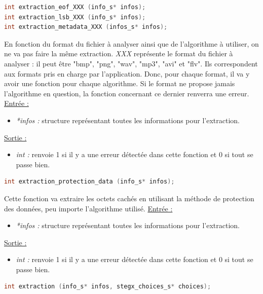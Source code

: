 \documentclass[11pt]{article}
\begin{document}
\begin{lstlisting}[language=c]
int extraction_eof_XXX (info_s* infos); 
int extraction_lsb_XXX (info_s* infos);
int extraction_metadata_XXX (infos_s* infos);
\end{lstlisting}

En fonction du format du fichier à analyser ainsi que de l'algorithme à 
utiliser, on ne va pas faire la même extraction. 
\textit{XXX} représente le format du fichier à analyser : il peut être 
"bmp", "png", "wav", "mp3", "avi" et "flv". Ils correspondent aux formats 
pris en charge par l'application. Donc, pour chaque format, il va y avoir 
une fonction pour chaque algorithme. Si le format ne propose jamais l'algorithme 
en question, la fonction concernant ce dernier renverra une erreur. 
\newline
\underline{Entrée :} 
\begin{itemize}
\item \textit{*infos :} structure représentant toutes les informations pour 
l'extraction. 
\end{itemize}
\underline{Sortie :} 
\begin{itemize}
\item \textit{int :} renvoie 1 si il y a une erreur détectée dans cette 
fonction et 0 si tout se passe bien.  
\newline 
\end{itemize}

\begin{lstlisting}[language=c]
int extraction_protection_data (info_s* infos); 
\end{lstlisting}

Cette fonction va extraire les octets cachés en utilisant la méthode 
de protection des données, peu importe l'algorithme utilisé. 
\newline
\underline{Entrée :} 
\begin{itemize}
\item \textit{*infos :} structure représentant toutes les informations pour 
l'extraction. 
\end{itemize}
\underline{Sortie :} 
\begin{itemize}
\item \textit{int :} renvoie 1 si il y a une erreur détectée dans cette 
fonction et 0 si tout se passe bien.  
\newline 
\end{itemize}

\begin{lstlisting}[language=c]
int extraction (info_s* infos, stegx_choices_s* choices); 
\end{lstlisting}
\end{document}
